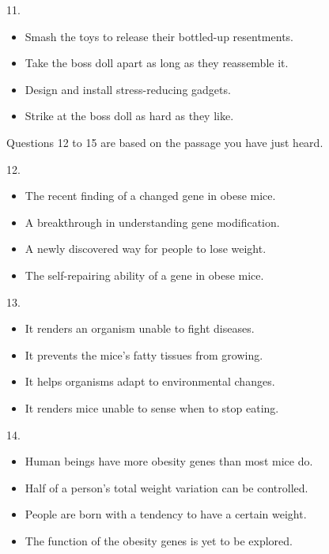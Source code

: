 \documentclass[UTF8,11pt]{ctexart}
\begin{document}
11.


\begin{itemize}[leftmargin=2em,itemsep=.2em,topsep=.4em]\item[A.] Smash the toys to release their bottled-up resentments.
\item[B.] Take the boss doll apart as long as they reassemble it.
\item[C.] Design and install stress-reducing gadgets.
\item[D.] Strike at the boss doll as hard as they like.
\end{itemize}

Questions 12 to 15 are based on the passage you have just heard.


12.


\begin{itemize}[leftmargin=2em,itemsep=.2em,topsep=.4em]\item[A.] The recent finding of a changed gene in obese mice.
\item[B.] A breakthrough in understanding gene modification.
\item[C.] A newly discovered way for people to lose weight.
\item[D.] The self-repairing ability of a gene in obese mice.
\end{itemize}

13.


\begin{itemize}[leftmargin=2em,itemsep=.2em,topsep=.4em]\item[A.] It renders an organism unable to fight diseases.
\item[B.] It prevents the mice’s fatty tissues from growing.
\item[C.] It helps organisms adapt to environmental changes.
\item[D.] It renders mice unable to sense when to stop eating.
\end{itemize}

14.


\begin{itemize}[leftmargin=2em,itemsep=.2em,topsep=.4em]\item[A.] Human beings have more obesity genes than most mice do.
\item[B.] Half of a person’s total weight variation can be controlled.
\item[C.] People are born with a tendency to have a certain weight.
\item[D.] The function of the obesity genes is yet to be explored.
\end{itemize}
\end{document}
